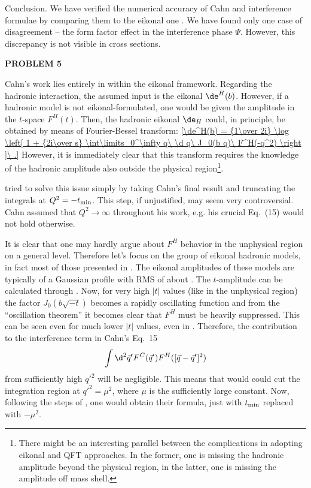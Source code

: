 Conclusion. We have verified the numerical accuracy of Cahn and \KL{} interference formulae by comparing them to the eikonal one . We have found only one case of disagreement -- the form factor effect in the interference phase $\Psi$. However, this discrepancy is not visible in cross sections.


{\bf PROBLEM 5}

Cahn's work lies entirely in within the eikonal framework. Regarding the hadronic interaction, the assumed input is the eikonal $\de^H(b)$. However, if a hadronic model is not eikonal-formulated, one would be given the amplitude in the $t$-space $F^H(t)$. Then, the hadronic eikonal $\de_H$ could, in principle, be obtained by means of Fourier-Bessel transform:
\eqref{\de^H(b) = {1\over 2i} \log \left[ 1 + {2i\over s} \int\limits_0^\infty q\ \d q\ J_0(b q)\ F^H(-q^2)  \right ]\ .}{}
However, it is immediately clear that this transform requires the knowledge of the hadronic amplitude also outside the physical region\footnote{There might be an interesting parallel between the complications in adopting eikonal and QFT approaches. In the former, one is missing the hadronic amplitude beyond the physical region, in the latter, one is missing the amplitude off mass shell.}.

\KaL{} tried to solve this issue simply by taking Cahn's final result and truncating the integrals at $Q^2 = - t_{\rm min}$. This step, if unjustified, may seem very controversial. Cahn assumed that $Q^2\to\infty$ throughout his work, e.g. his crucial Eq.~(15) would not hold otherwise.

It is clear that one may hardly argue about $F^H$ behavior in the unphysical region on a general level. Therefore let's focus on the group of eikonal hadronic models, in fact most of those presented in . The eikonal amplitudes  of these models are typically of a Gaussian profile   with RMS of about . The $t$-amplitude can be calculated through . Now, for very high $|t|$ values (like in the unphysical region) the factor $J_0(b\sqrt{-t})$ becomes a rapidly oscillating function and from the ``oscillation theorem''  it becomes clear that $F^H$ must be heavily suppressed. This can be seen even for much lower $|t|$ values, even in . Therefore, the contribution to the interference term in Cahn's Eq.~15
$$\int \d^2 \vec q' F^C(\vec q') F^H([\vec q - \vec q']^2)$$
from sufficiently high $q'^2$ will be negligible. This means that would could cut the integration region at $q'^2 = \mu^2$, where $\mu$ is the sufficiently large constant. Now, following the steps of \KaL{}, one would obtain their formula, just with $t_{\rm min}$ replaced with $-\mu^2$.

